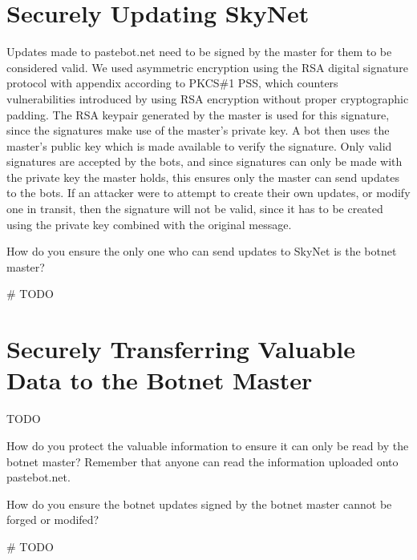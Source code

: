\documentclass[9pt,a4paper]{article}
\begin{document}
\maketitle
\small
\setlength{\parindent}{0pt}

\section{Securely Updating SkyNet}
\vspace{-2ex}
Updates made to pastebot.net need to be signed by the master for them to be considered valid. We used asymmetric encryption using the RSA digital signature protocol with appendix according to PKCS\#1 PSS, which counters vulnerabilities introduced by using RSA encryption without proper cryptographic padding. The RSA keypair generated by the master is used for this signature, since the signatures make use of the master's private key. A bot then uses the master's public key which is made available to verify the signature. Only valid signatures are accepted by the bots, and since signatures can only be made with the private key the master holds, this ensures only the master can send updates to the bots. If an attacker were to attempt to create their own updates, or modify one in transit, then the signature will not be valid, since it has to be created using the private key combined with the original message.

How do you ensure the only one who can send updates to SkyNet is the botnet master?


\begin{center}
\vspace{-2ex}
\begin{python}
# TODO
\end{python}
\end{center}

\section{Securely Transferring Valuable Data to the Botnet Master}
\vspace{-2ex}
TODO

How do you protect the valuable information to ensure it can only  be read by the botnet master? Remember that anyone can read the  information uploaded onto pastebot.net.

 How do you ensure the botnet updates signed by the botnet master cannot be forged or modifed?

\begin{center}
\vspace{-2ex}
\begin{python}
# TODO
\end{python}
\end{center}
\end{document}
